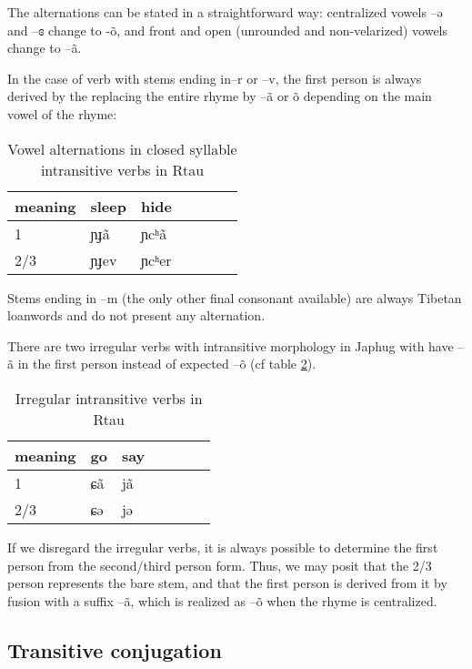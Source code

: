 \documentclass[oneside,a4paper,11pt]{article}
\newcommand{\ipa}[1]{{\phon #1}} %
\begin{document}
The alternations can be stated in a straightforward way: centralized vowels  --\ipa{ə} and  --\ipa{ɞ} change to -\ipa{õ}, and front and open (unrounded and non-velarized) vowels change to --\ipa{ã}.

In the case of verb with stems ending in--\ipa{r} or --\ipa{v}, the first person is always derived by the replacing the entire rhyme by --\ipa{ã} or \ipa{õ} depending on the main vowel of the rhyme:
\begin{table}[H]
\caption{Vowel alternations in closed syllable intransitive verbs in Rtau} \label{tab:close.intr} \centering
\begin{tabular}{llll|ll|l}
\toprule
meaning &	sleep   &  	hide   \\  
\midrule
1&	\ipa{ɲɟã} & 	\ipa{ɲcʰã} \\ 
2/3&	\ipa{ɲɟev} & 	\ipa{ɲcʰer} \\ 
\bottomrule
\end{tabular}
\end{table}

Stems ending in --\ipa{m} (the only other final consonant available) are always Tibetan loanwords and do not present any alternation.


There are two irregular verbs with intransitive morphology in Japhug with have \ipa{--ã} in the first person instead of expected \ipa{--õ} (cf table \ref{tab:irr.intr}). 

\begin{table}[H]
\caption{Irregular intransitive verbs in Rtau} \label{tab:irr.intr} \centering
\begin{tabular}{llll|ll|l}
\toprule
meaning &	go     & say \\  
\midrule
1&	\ipa{ɕã}  	 &\ipa{jã}\\ 
2/3&	\ipa{ɕə} & 	\ipa{jə} &\\ 
\bottomrule
\end{tabular}
\end{table}

 

If we disregard the irregular verbs, it is always possible to determine the first person from the second/third person form. Thus, we may posit that the 2/3 person represents the bare stem, and that the first person is derived from it by fusion with a suffix --\ipa{ã}, which is realized as --\ipa{õ} when the rhyme is centralized.

\subsection{Transitive conjugation} \label{sec:tr}
\end{document}
